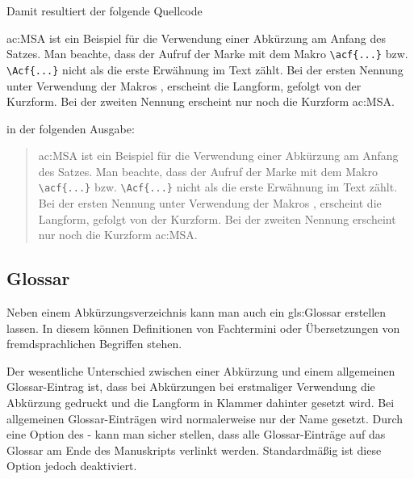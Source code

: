 Damit resultiert der folgende Quellcode
\begin{latex}[caption={Verwendung von Abkürzungen},label={lst:AcronymUsage}]
    \Acf{ac:MSA} ist ein Beispiel für die Verwendung
    einer Abkürzung am Anfang des Satzes. Man beachte,
    dass der Aufruf der Marke mit dem Makro
    \lstinline|\acf{...}| bzw. \lstinline|\Acf{...}|
    nicht als die erste Erwähnung im Text zählt.
    Bei der ersten Nennung  unter
    Verwendung der Makros ,  \oae
    erscheint die Langform, gefolgt von der Kurzform.
    Bei der zweiten Nennung 
    erscheint nur noch die Kurzform \ac{ac:MSA}.
\end{latex}
%
in der folgenden Ausgabe:
%
\begin{quote}
    \Acf{ac:MSA} ist ein Beispiel für die Verwendung
    einer Abkürzung am Anfang des Satzes. Man beachte,
    dass der Aufruf der Marke mit dem Makro
    \lstinline|\acf{...}| bzw. \lstinline|\Acf{...}|
    nicht als die erste Erwähnung im Text zählt.
    Bei der ersten Nennung  unter
    Verwendung der Makros ,  \oae
    erscheint die Langform, gefolgt von der Kurzform.
    Bei der zweiten Nennung 
    erscheint nur noch die Kurzform \ac{ac:MSA}.
\end{quote}


\subsection*{Glossar}%
%
\label{sec:Glossar}

Neben einem Abkürzungsverzeichnis kann man auch ein
\gls{gls:Glossar} erstellen lassen.
In diesem können Definitionen von Fachtermini oder
Übersetzungen von fremdsprachlichen Begriffen stehen.

Der wesentliche Unterschied zwischen einer Abkürzung und einem allgemeinen Glossar-Eintrag ist,
dass bei Abkürzungen bei erstmaliger Verwendung die Abkürzung gedruckt und die Langform in Klammer dahinter gesetzt wird.
Bei allgemeinen Glossar-Einträgen wird normalerweise nur der Name gesetzt.
Durch eine Option des - kann man sicher stellen,
dass alle Glossar-Einträge auf das Glossar am Ende des Manuskripts verlinkt werden.
Standardmäßig ist diese Option jedoch deaktiviert.

